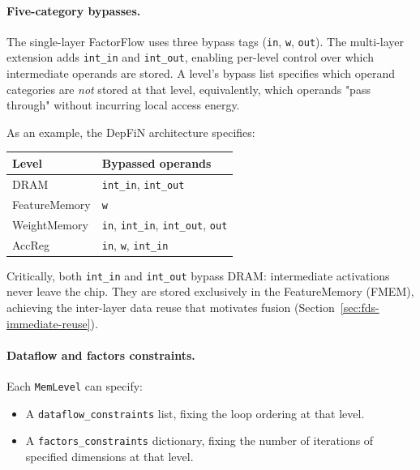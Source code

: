 \paragraph{Five-category bypasses.}
The single-layer FactorFlow uses three bypass tags
(\texttt{in}, \texttt{w}, \texttt{out}).
The multi-layer extension adds \texttt{int\_in} and \texttt{int\_out},
enabling per-level control over which intermediate operands are stored.
A level's bypass list specifies which operand categories are
\emph{not} stored at that level, equivalently, which operands "pass
through" without incurring local access energy.

As an example, the DepFiN architecture specifies:
\begin{center}
\label{tab: fused-bypasses}
\small
\begin{tabular}{ll}
  \toprule
  \textbf{Level} & \textbf{Bypassed operands} \\
  \midrule
  DRAM           & \texttt{int\_in}, \texttt{int\_out} \\
  FeatureMemory  & \texttt{w} \\
  WeightMemory   & \texttt{in}, \texttt{int\_in},
                   \texttt{int\_out}, \texttt{out} \\
  AccReg         & \texttt{in}, \texttt{w}, \texttt{int\_in} \\
  \bottomrule
\end{tabular}

\end{center}

\noindent
Critically, both \texttt{int\_in} and \texttt{int\_out} bypass DRAM:
intermediate activations never leave the chip.
They are stored exclusively in the FeatureMemory (FMEM), achieving the
inter-layer data reuse that motivates fusion
(Section~\ref{sec:fds-immediate-reuse}).

\paragraph{Dataflow and factors constraints.}
Each \texttt{MemLevel} can specify:
\begin{itemize}
  \item A \texttt{dataflow\_constraints} list, fixing the loop
        ordering at that level.  
  \item A \texttt{factors\_constraints} dictionary, fixing the number
        of iterations of specified dimensions at that level.
\end{itemize}

